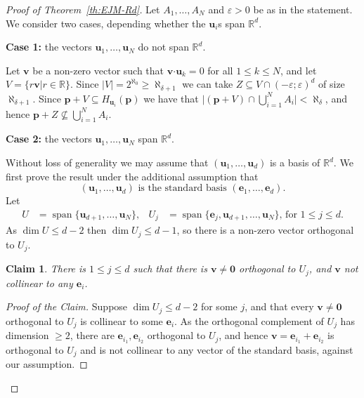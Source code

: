 \documentclass[12pt]{amsart}
\newcommand{\R}{\mathbb{R}}	%
\newcommand{\Mid}{\boldsymbol\mid}			%
\newcommand{\set}[1]{\mathopen \{ {#1} \mathclose \}} %
\newcommand{\setof}[2]{\mathopen \{{#1}\Mid{#2} \mathclose\}} %
\newcommand{\card}[1]{\mathopen | #1 \mathclose |}		%
\DeclareMathOperator{\Span}{span}
\theoremstyle{plain}
\newtheorem{claim}{Claim}[theorem]
\theoremstyle{definition}
\theoremstyle{remark}
\begin{document}
\begin{proof}[Proof of Theorem~\ref{th:EJM-Rd}]
Let \( A_1 , \dots , A_N \) and \( \varepsilon > 0 \) be as in the statement.
We consider two cases, depending whether the \( \mathbf{u}_i \)s span \( \R^d \).

\smallskip

\textbf{Case 1:} the vectors \( \mathbf{u}_1 , \dots , \mathbf{u}_N \) do not span \( \R^d \).

Let \( \mathbf{v} \) be a non-zero vector such that \( \mathbf{v} \boldsymbol{\cdot} \mathbf{u}_k = 0 \) for all \( 1 \leq k \leq N \), and let \( V = \setof{ r \mathbf{v} }{ r \in \R } \).
Since \( \card{V} = 2^{\aleph_0 } \geq \aleph_{ \delta + 1 } \) we can take \( Z \subseteq V \cap ( - \varepsilon ; \varepsilon )^d \) of size \( \aleph_{ \delta + 1 } \).
Since \( \mathbf{p} + V \subseteq H_{ \mathbf{u}_i } ( \mathbf{p} ) \) we have that \( \card{ ( \mathbf{p} + V ) \cap \bigcup_{ i = 1 }^N A_i } < \aleph_ \delta \), and hence \( \mathbf{p} + Z \nsubseteq \bigcup_{ i = 1 }^N A_i \).

\smallskip

\textbf{Case 2:} the vectors \( \mathbf{u}_1 , \dots , \mathbf{u}_N \) span \( \R^d \).

Without loss of generality we may assume that \( ( \mathbf{u}_1 , \dots , \mathbf{u}_d ) \) is a basis of \( \R^d \).
We first prove the result under the additional assumption that 
\[ 
( \mathbf{u}_1 , \dots , \mathbf{u}_d ) \text{ is the standard basis } ( \mathbf{e}_1 , \dots , \mathbf{e}_d ) .
\]
Let
\begin{align*}
U & = \Span \set{ \mathbf{u}_{ d + 1 } , \dots , \mathbf{u}_N } , & U_j & = \Span \set{ \mathbf{e}_j , \mathbf{u}_{ d + 1 } , \dots , \mathbf{u}_N } \text{, for } 1 \leq j \leq d .
\end{align*}
As \( \dim U \leq d - 2 \) then \( \dim U_j \leq d - 1 \), so there is a non-zero vector orthogonal to \( U_j \).

\begin{claim}
There is \( 1 \leq j \leq d \) such that there is \( \mathbf{v} \neq \mathbf{0} \) orthogonal to \( U_j \), and \( \mathbf{v} \) not collinear to any \( \mathbf{e}_i \).
\end{claim}

\begin{proof}[Proof of the Claim]
Suppose \( \dim U_j \leq d - 2 \) for some \( j \), and that every \( \mathbf{v} \neq \mathbf{0} \) orthogonal to \( U_j \) is collinear to some \( \mathbf{e}_i \).
As the orthogonal complement of \( U_j \) has dimension \( \geq 2 \), there are \( \mathbf{e}_{i_1} , \mathbf{e}_{i_2} \) orthogonal to \( U_j \), and hence \( \mathbf{v} = \mathbf{e}_{i_1} + \mathbf{e}_{i_2} \) is orthogonal to \( U_j \) and is not collinear to any vector of the standard basis, against our assumption.


\end{proof}
\end{proof}
\end{document}
